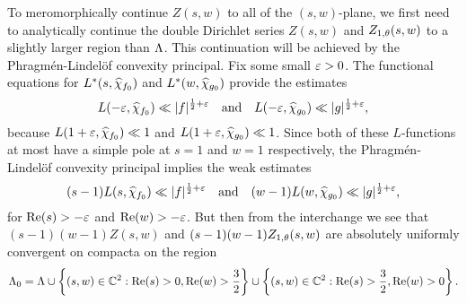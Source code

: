 \documentclass[12pt,reqno,oneside]{amsart}
\begin{document}
     To meromorphically continue $Z(s,w)$ to all of the $(s,w)$-plane, we first need to analytically continue the double Dirichlet series $Z(s,w)$ and $Z_{1,\theta}(s,w)$ to a slightly larger region than $\Lambda$. This continuation will be achieved by the Phragm\'en-Lindel\"of convexity principal. Fix some small $\varepsilon > 0$. The functional equations for $L^{\ast}(s,\widehat{\chi}_{f_{0}})$ and $L^{\ast}(w,\widehat{\chi}_{g_{0}})$ provide the estimates
    \[
        L(-\varepsilon,\widehat{\chi}_{f_{0}}) \ll |f|^{\frac{1}{2}+\varepsilon} \quad \text{and} \quad L(-\varepsilon,\widehat{\chi}_{g_{0}}) \ll |g|^{\frac{1}{2}+\varepsilon},
    \]
    because $L(1+\varepsilon,\widehat{\chi}_{f_{0}}) \ll 1$ and $L(1+\varepsilon,\widehat{\chi}_{g_{0}}) \ll 1$. Since both of these $L$-functions at most have a simple pole at $s = 1$ and $w = 1$ respectively, the Phragm\'en-Lindel\"of convexity principal implies the weak estimates
    \[
        (s-1)L(s,\widehat{\chi}_{f_{0}}) \ll |f|^{\frac{1}{2}+\varepsilon} \quad \text{and} \quad (w-1)L(w,\widehat{\chi}_{g_{0}}) \ll |g|^{\frac{1}{2}+\varepsilon},
    \]
    for $\mathrm{Re}(s) > -\varepsilon$ and $\mathrm{Re}(w) > -\varepsilon$. But then from the interchange we see that $(s-1)(w-1)Z(s,w)$ and $(s-1)(w-1)Z_{1,\theta}(s,w)$ are absolutely uniformly convergent on compacta on the region
    \[
        \Lambda_{0} = \Lambda \cup \left\{(s,w) \in \mathbb{C}^{2}:\mathrm{Re}(s) > 0, \mathrm{Re}(w) > \frac{3}{2}\right\} \cup \left\{(s,w) \in \mathbb{C}^{2}:\mathrm{Re}(s) > \frac{3}{2}, \mathrm{Re}(w) > 0\right\}.
    \]
    
    \begin{center}
    \end{center}
    
\end{document}
